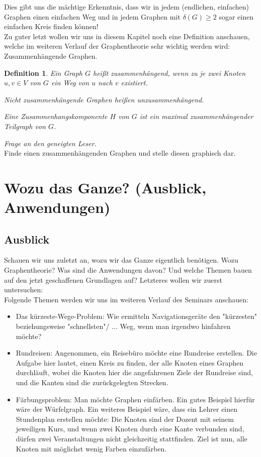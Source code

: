 \documentclass{article}
\newtheorem{definition}{Definition}
\begin{document}
Dies gibt uns die mächtige Erkenntnis, dass wir in jedem (endlichen, einfachen) Graphen einen einfachen Weg und in jedem Graphen mit $\delta(G) \geq 2$ sogar einen einfachen Kreis finden können!\\
\bigskip
Zu guter letzt wollen wir uns in diesem Kapitel noch eine Definition anschauen, welche im weiteren Verlauf der Graphentheorie sehr wichtig werden wird: Zusammenhängende Graphen.\\
\begin{definition}
	Ein Graph $G$ heißt \emph{zusammenhängend}, wenn zu je zwei Knoten $u, v \in V$ von $G$ ein \emph{Weg} von $u$ nach $v$ existiert.
	\par\bigskip
	Nicht zusammenhängende Graphen heißen \emph{unzusammenhängend}.
	\par\bigskip
	Eine \emph{Zusammenhangskomponente} $H$ von $G$ ist ein \emph{maximal zusammenhängender Teilgraph} von $G$.
\end{definition}
\bigskip
\emph{Frage an den geneigten Leser.}\\
Finde einen zusammenhängenden Graphen und stelle diesen graphisch dar.\\

\newpage
\section[Wozu das Ganze?]{Wozu das Ganze? (Ausblick, Anwendungen)}
\subsection{Ausblick}
Schauen wir uns zuletzt an, wozu wir das Ganze eigentlich benötigen. Wozu Graphentheorie? Was sind die Anwendungen davon? Und welche Themen bauen auf den jetzt geschaffenen Grundlagen auf? Letzteres wollen wir zuerst untersuchen:\\
Folgende Themen werden wir uns im weiteren Verlauf des Seminars anschauen:\\
\begin{itemize}
	\item{Das kürzeste-Wege-Problem: Wie ermitteln Navigationsgeräte den "kürzesten" beziehungsweise "schnellsten"/ $\ldots$ Weg, wenn man irgendwo hinfahren möchte?}
	\item{Rundreisen: Angenommen, ein Reisebüro möchte eine Rundreise erstellen. Die Aufgabe hier lautet, einen Kreis zu finden, der alle Knoten eines Graphen durchläuft, wobei die Knoten hier die angefahrenen Ziele der Rundreise sind, und die Kanten sind die zurückgelegten Strecken.}
	\item{Färbungsproblem: Man möchte Graphen einfärben. Ein gutes Beispiel hierfür wäre der Würfelgraph. Ein weiteres Beispiel wäre, dass ein Lehrer einen Stundenplan erstellen möchte: Die Knoten sind der Dozent mit seinem jeweiligen Kurs, und wenn zwei Knoten durch eine Kante verbunden sind, dürfen zwei Veranstaltungen nicht gleichzeitig stattfinden. Ziel ist nun, alle Knoten mit möglichst wenig Farben einzufärben.}
\end{itemize}
\end{document}
